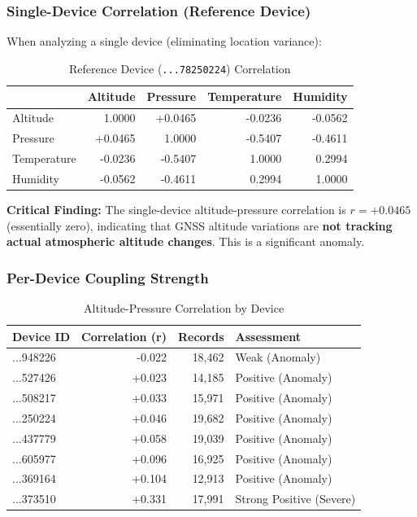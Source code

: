 \documentclass[11pt,a4paper]{article}
\begin{document}
\subsubsection{Single-Device Correlation (Reference Device)}

When analyzing a single device (eliminating location variance):

\begin{table}[H]
\centering
\caption{Reference Device (\texttt{...78250224}) Correlation}
\begin{tabular}{lrrrr}
\toprule
 & \textbf{Altitude} & \textbf{Pressure} & \textbf{Temperature} & \textbf{Humidity} \\
\midrule
Altitude & 1.0000 & \textcolor{tier3}{+0.0465} & -0.0236 & -0.0562 \\
Pressure & +0.0465 & 1.0000 & -0.5407 & -0.4611 \\
Temperature & -0.0236 & -0.5407 & 1.0000 & 0.2994 \\
Humidity & -0.0562 & -0.4611 & 0.2994 & 1.0000 \\
\bottomrule
\end{tabular}
\end{table}

\textbf{Critical Finding:} The single-device altitude-pressure correlation is $r = +0.0465$ (essentially zero), indicating that GNSS altitude variations are \textbf{not tracking actual atmospheric altitude changes}. This is a significant anomaly.

\subsubsection{Per-Device Coupling Strength}

\begin{table}[H]
\centering
\caption{Altitude-Pressure Correlation by Device}
\begin{tabular}{lrrl}
\toprule
\textbf{Device ID} & \textbf{Correlation (r)} & \textbf{Records} & \textbf{Assessment} \\
\midrule
...948226 & -0.022 & 18,462 & Weak (Anomaly) \\
...527426 & +0.023 & 14,185 & Positive (Anomaly) \\
...508217 & +0.033 & 15,971 & Positive (Anomaly) \\
...250224 & +0.046 & 19,682 & Positive (Anomaly) \\
...437779 & +0.058 & 19,039 & Positive (Anomaly) \\
...605977 & +0.096 & 16,925 & Positive (Anomaly) \\
...369164 & +0.104 & 12,913 & Positive (Anomaly) \\
...373510 & \textcolor{tier3}{+0.331} & 17,991 & \textcolor{tier3}{Strong Positive (Severe)} \\
\bottomrule
\end{tabular}
\end{table}
\end{document}
